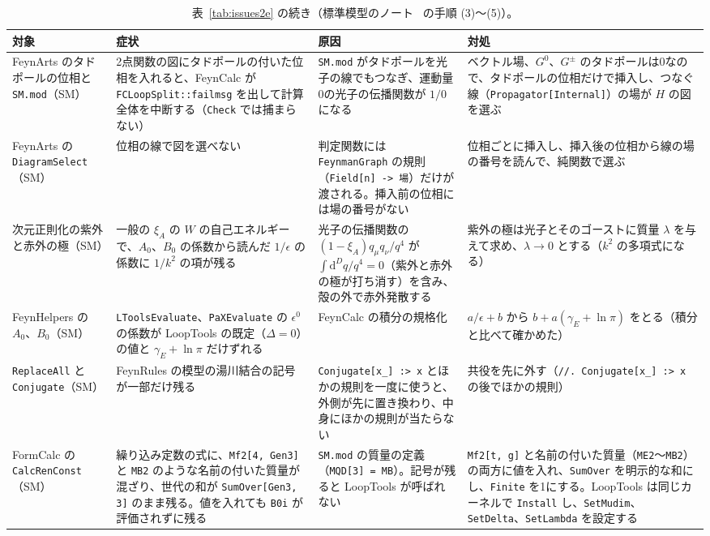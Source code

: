 \documentclass[a4paper,10pt]{ltjsarticle}
\begin{document}
\begin{table}[tbp]
\centering\footnotesize
\caption{表~\ref{tab:issues2e} の続き（標準模型のノート~\cite{smnote} の手順 (3)〜(5)）。}
\label{tab:issues2f}
\begin{tabularx}{\linewidth}{>{\raggedright\arraybackslash}p{2.4cm}>{\raggedright\arraybackslash}X>{\raggedright\arraybackslash}X>{\raggedright\arraybackslash}X}
\toprule
\textbf{対象} & \textbf{症状} & \textbf{原因} & \textbf{対処} \\
\midrule
FeynArts のタドポールの位相と \texttt{SM.mod}（SM） & 2点関数の図にタドポールの付いた位相を入れると、FeynCalc が \texttt{FCLoopSplit::failmsg} を出して計算全体を中断する（\texttt{Check} では捕まらない） & \texttt{SM.mod} がタドポールを光子の線でもつなぎ、運動量0の光子の伝播関数が $1/0$ になる & ベクトル場、$G^0$、$G^\pm$ のタドポールは0なので、タドポールの位相だけで挿入し、つなぐ線（\texttt{Propagator[Internal]}）の場が $H$ の図を選ぶ \\
FeynArts の \texttt{DiagramSelect}（SM） & 位相の線で図を選べない & 判定関数には \texttt{FeynmanGraph} の規則（\texttt{Field[n] -> 場}）だけが渡される。挿入前の位相には場の番号がない & 位相ごとに挿入し、挿入後の位相から線の場の番号を読んで、純関数で選ぶ \\
次元正則化の紫外と赤外の極（SM） & 一般の $\xi_A$ の $W$ の自己エネルギーで、$A_0$、$B_0$ の係数から読んだ $1/\epsilon$ の係数に $1/k^2$ の項が残る & 光子の伝播関数の $(1-\xi_A)q_\mu q_\nu/q^4$ が $\int\mathrm{d}^Dq/q^4=0$（紫外と赤外の極が打ち消す）を含み、殻の外で赤外発散する & 紫外の極は光子とそのゴーストに質量 $\lambda$ を与えて求め、$\lambda\to0$ とする（$k^2$ の多項式になる） \\
FeynHelpers の $A_0$、$B_0$（SM） & \texttt{LToolsEvaluate}、\texttt{PaXEvaluate} の $\epsilon^0$ の係数が LoopTools の既定（$\Delta=0$）の値と $\gamma_E+\ln\pi$ だけずれる & FeynCalc の積分の規格化 & $a/\epsilon+b$ から $b+a(\gamma_E+\ln\pi)$ をとる（積分と比べて確かめた） \\
\texttt{ReplaceAll} と \texttt{Conjugate}（SM） & FeynRules の模型の湯川結合の記号が一部だけ残る & \texttt{Conjugate[x\_] :> x} とほかの規則を一度に使うと、外側が先に置き換わり、中身にほかの規則が当たらない & 共役を先に外す（\texttt{//. Conjugate[x\_] :> x} の後でほかの規則） \\
FormCalc の \texttt{CalcRenConst}（SM） & 繰り込み定数の式に、\texttt{Mf2[4, Gen3]} と \texttt{MB2} のような名前の付いた質量が混ざり、世代の和が \texttt{SumOver[Gen3, 3]} のまま残る。値を入れても \texttt{B0i} が評価されずに残る & \texttt{SM.mod} の質量の定義（\texttt{MQD[3] = MB}）。記号が残ると LoopTools が呼ばれない & \texttt{Mf2[t, g]} と名前の付いた質量（\texttt{ME2}〜\texttt{MB2}）の両方に値を入れ、\texttt{SumOver} を明示的な和にし、\texttt{Finite} を1にする。LoopTools は同じカーネルで \texttt{Install} し、\texttt{SetMudim}、\texttt{SetDelta}、\texttt{SetLambda} を設定する \\

\end{tabularx}
\end{table}
\end{document}
